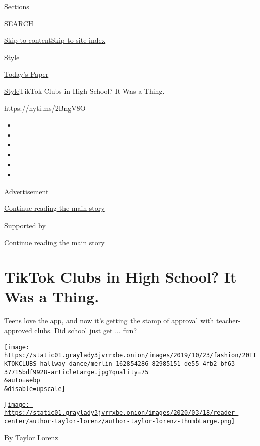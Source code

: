 Sections

SEARCH

\protect\hyperlink{site-content}{Skip to
content}\protect\hyperlink{site-index}{Skip to site index}

\href{https://www.nytimes3xbfgragh.onion/section/style}{Style}

\href{https://myaccount.nytimes3xbfgragh.onion/auth/login?response_type=cookie\&client_id=vi}{}

\href{https://www.nytimes3xbfgragh.onion/section/todayspaper}{Today's
Paper}

\href{/section/style}{Style}\textbar{}TikTok Clubs in High School? It
Was a Thing.

\url{https://nyti.ms/2BngV8O}

\begin{itemize}
\item
\item
\item
\item
\item
\item
\end{itemize}

Advertisement

\protect\hyperlink{after-top}{Continue reading the main story}

Supported by

\protect\hyperlink{after-sponsor}{Continue reading the main story}

\hypertarget{tiktok-clubs-in-high-school-it-was-a-thing}{%
\section{TikTok Clubs in High School? It Was a
Thing.}\label{tiktok-clubs-in-high-school-it-was-a-thing}}

Teens love the app, and now it's getting the stamp of approval with
teacher-approved clubs. Did school just get ... fun?

\texttt{[image: https://static01.graylady3jvrrxbe.onion/images/2019/10/23/fashion/20TIKTOKCLUBS-hallway-dance/merlin\_162854286\_82985151-de55-4fb2-bf63-37715bdf9928-articleLarge.jpg?quality=75\\\&auto=webp\\\&disable=upscale]}

\href{https://www.nytimes3xbfgragh.onion/by/taylor-lorenz}{\texttt{[image: https://static01.graylady3jvrrxbe.onion/images/2020/03/18/reader-center/author-taylor-lorenz/author-taylor-lorenz-thumbLarge.png]}}

By \href{https://www.nytimes3xbfgragh.onion/by/taylor-lorenz}{Taylor
Lorenz}

